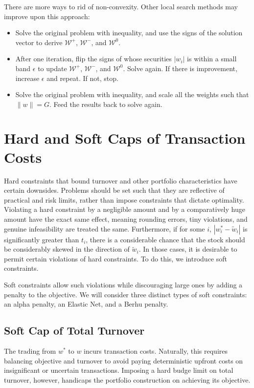 \documentclass[11pt, letterpaper]{article}
\begin{document}
There are more ways to rid of non-convexity. Other local search methods may improve upon this approach:
\begin{itemize}
\item Solve the original problem with inequality, and use the signs of the solution vector to derive $\mathcal{W}^+$,
	$\mathcal{W}^-$, and $\mathcal{W}^0$.
\item After one iteration, flip the signs of whose securities $|w_i|$ is within a small band $\epsilon$ to update
  $\mathcal{W}^+$, $\mathcal{W}^-$, and $\mathcal{W}^0$. Solve again. If there is improvement, increase $\epsilon$ and repeat.
  If not, stop.
\item Solve the original problem with inequality, and scale all the weights such that $\lVert w\rVert = G$.  Feed the results
  back to solve again.
\end{itemize}

\section{Hard and Soft Caps of Transaction Costs}
\label{additional_gating}

Hard constraints that bound turnover and other portfolio characteristics have certain downsides. Problems should be set such that they are
reflective of practical and risk limits, rather than impose constraints that dictate optimality.
Violating a hard constraint by a negligible amount and by a comparatively huge amount have the exact same effect, meaning rounding
errors, tiny violations, and genuine infeasibility are treated the same. Furthermore, if for some $i$, $|w_i^* - \tilde{w}_i|$ is significantly
greater than $t_i$, there is a considerable chance that the stock should be considerably skewed in the direction of $\tilde{w}_i$. In those cases,
it is desirable to permit certain violations of hard constraints. To do this, we introduce soft constraints.

Soft constraints allow such violations while discouraging large ones by adding a penalty to the objective. We will consider three
distinct types of soft constraints: an alpha penalty, an Elastic Net, and a Berhu penalty.

\subsection{Soft Cap of Total Turnover}
The trading from $w^*$ to $w$ incurs transaction costs. Naturally, this requires balancing objective and turnover to avoid
paying deterministic upfront costs on insignificant or uncertain transactions. Imposing a hard budge limit on total turnover,
however, handicaps the portfolio construction on achieving its objective.
\end{document}
